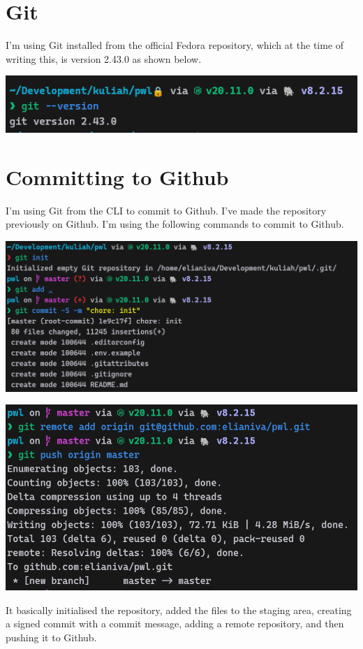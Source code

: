 \documentclass[12pt,titlepage]{article}
\begin{document}
\section{Git}

I'm using Git installed from the official Fedora repository,
which at the time of writing this, is version 2.43.0 as shown below.

\vspace*{5mm}

\includegraphics[width=.6\textwidth]{./images/git.png}

\pagebreak

\section{Committing to Github}
I'm using Git from the CLI to commit to Github. I've made the repository previously
on Github. I'm using the following commands to commit to Github.

\vspace*{5mm}

\includegraphics[width=.6\textwidth]{./images/git-1.png}

\includegraphics[width=.6\textwidth]{./images/git-2.png}

It basically initialised the repository, added the files to the staging area,
creating a signed commit with a commit message, adding a remote repository,
and then pushing it to Github.
\end{document}

